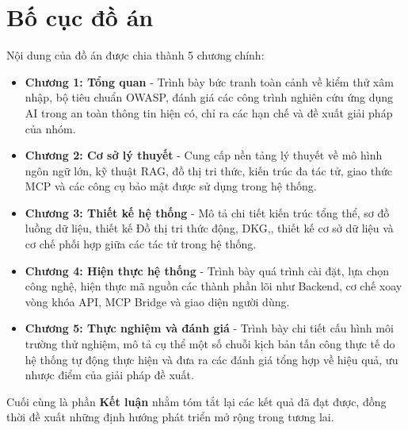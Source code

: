 \section*{Bố cục đồ án}
Nội dung của đồ án được chia thành 5 chương chính:
\begin{itemize}
    \item \textbf{Chương 1: Tổng quan} - Trình bày bức tranh toàn cảnh về kiểm thử xâm nhập, bộ tiêu chuẩn OWASP, đánh giá các công trình nghiên cứu ứng dụng AI trong an toàn thông tin hiện có, chỉ ra các hạn chế và đề xuất giải pháp của nhóm.
    \item \textbf{Chương 2: Cơ sở lý thuyết} - Cung cấp nền tảng lý thuyết về mô hình ngôn ngữ lớn, kỹ thuật RAG, đồ thị tri thức, kiến trúc đa tác tử, giao thức MCP và các công cụ bảo mật được sử dụng trong hệ thống.
    \item \textbf{Chương 3: Thiết kế hệ thống} - Mô tả chi tiết kiến trúc tổng thể, sơ đồ luồng dữ liệu, thiết kế Đồ thị tri thức động, DKG,, thiết kế cơ sở dữ liệu và cơ chế phối hợp giữa các tác tử trong hệ thống.
    \item \textbf{Chương 4: Hiện thực hệ thống} - Trình bày quá trình cài đặt, lựa chọn công nghệ, hiện thực mã nguồn các thành phần lõi như Backend, cơ chế xoay vòng khóa API, MCP Bridge và giao diện người dùng.
    \item \textbf{Chương 5: Thực nghiệm và đánh giá} - Trình bày chi tiết cấu hình môi trường thử nghiệm, mô tả cụ thể một số chuỗi kịch bản tấn công thực tế do hệ thống tự động thực hiện và đưa ra các đánh giá tổng hợp về hiệu quả, ưu nhược điểm của giải pháp đề xuất.
\end{itemize}
Cuối cùng là phần \textbf{Kết luận} nhằm tóm tắt lại các kết quả đã đạt được, đồng thời đề xuất những định hướng phát triển mở rộng trong tương lai.
